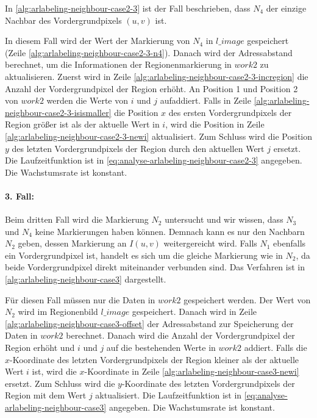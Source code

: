 In \autoref{alg:arlabeling-neighbour-case2-3} ist der Fall beschrieben, dass $N_4$ der einzige Nachbar des
 Vordergrundpixels $(u,v)$ ist.

In diesem Fall wird der Wert der Markierung von $N_4$ in $\mathit{l\_image}$ gespeichert
 (Zeile \ref{alg:arlabeling-neighbour-case2-3-n4}). Danach wird der Adressabstand berechnet, um die Informationen der
 Regionenmarkierung in $\mathit{work2}$ zu aktualisieren. Zuerst wird in Zeile
 \ref{alg:arlabeling-neighbour-case2-3-incregion} die Anzahl der Vordergrundpixel der Region erhöht. An Position 1 und
 Position 2 von $\mathit{work2}$ werden die Werte von $i$ und $j$ aufaddiert. Falls in Zeile
 \ref{alg:arlabeling-neighbour-case2-3-isismaller} die Position $x$ des ersten Vordergrundpixels der Region größer ist
 als der aktuelle Wert in $i$, wird die Position in Zeile \ref{alg:arlabeling-neighbour-case2-3-newi} aktualisiert. Zum
 Schluss wird die Position $y$ des letzten Vordergrundpixels der Region durch den aktuellen Wert $j$ ersetzt. Die
 Laufzeitfunktion ist in \autoref{eq:analyse-arlabeling-neighbour-case2-3} angegeben. Die Wachstumsrate ist konstant.


\paragraph{3. Fall:} %
\label{par:fall_3_}
Beim dritten Fall wird die Markierung $N_2$ untersucht und wir wissen, dass $N_3$ und $N_4$ keine Markierungen haben
 können. Demnach kann es nur den Nachbarn $N_2$ geben, dessen Markierung an $I(u,v)$ weitergereicht wird. Falls $N_1$
 ebenfalls ein Vordergrundpixel ist, handelt es sich um die gleiche Markierung wie in $N_2$, da beide Vordergrundpixel
 direkt miteinander verbunden sind. Das Verfahren ist in \autoref{alg:arlabeling-neighbour-case3} dargestellt.

Für diesen Fall müssen nur die Daten in $\mathit{work2}$ gespeichert werden. Der Wert von $N_2$ wird im Regionenbild
 $\mathit{l\_image}$ gespeichert. Danach wird in Zeile \ref{alg:arlabeling-neighbour-case3-offset} der Adressabstand
 zur Speicherung der Daten in $\mathit{work2}$ berechnet. Danach wird die Anzahl der Vordergrundpixel der Region erhöht
 und $i$ und $j$ auf die bestehenden Werte in $\mathit{work2}$ addiert. Falls die $x$-Koordinate des letzten
 Vordergrundpixels der Region kleiner als der aktuelle Wert $i$ ist, wird die $x$-Koordinate in Zeile
 \ref{alg:arlabeling-neighbour-case3-newi} ersetzt. Zum Schluss wird die $y$-Koordinate des letzten Vordergrundpixels
 der Region mit dem Wert $j$ aktualisiert. Die Laufzeitfunktion ist in \autoref{eq:analyse-arlabeling-neighbour-case3}
 angegeben. Die Wachstumsrate ist konstant.


